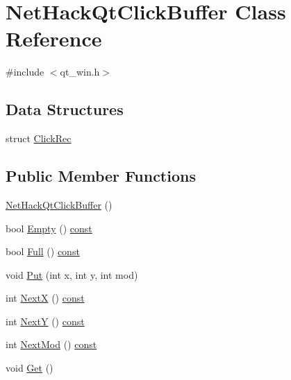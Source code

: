 \hypertarget{classNetHackQtClickBuffer}{\section{Net\+Hack\+Qt\+Click\+Buffer Class Reference}
\label{classNetHackQtClickBuffer}
}


{\ttfamily \#include $<$qt\+\_\+win.\+h$>$}

\subsection*{Data Structures}
\begin{DoxyCompactItemize}
\item 
struct \hyperlink{structNetHackQtClickBuffer_1_1ClickRec}{Click\+Rec}
\end{DoxyCompactItemize}
\subsection*{Public Member Functions}
\begin{DoxyCompactItemize}
\item 
\hyperlink{classNetHackQtClickBuffer_a7bda526e96c5508a468d05b38ef460bf}{Net\+Hack\+Qt\+Click\+Buffer} ()
\item 
bool \hyperlink{classNetHackQtClickBuffer_a1870b7371855d6a4bc2e6a26753d6153}{Empty} () \hyperlink{tradstdc_8h_a2c212835823e3c54a8ab6d95c652660e}{const} 
\item 
bool \hyperlink{classNetHackQtClickBuffer_aaef180051e0b24364a0f1b36603995d9}{Full} () \hyperlink{tradstdc_8h_a2c212835823e3c54a8ab6d95c652660e}{const} 
\item 
void \hyperlink{classNetHackQtClickBuffer_ae509a25bfe7eee23b7980ce39a172649}{Put} (int x, int y, int mod)
\item 
int \hyperlink{classNetHackQtClickBuffer_aad1ee4d7e24e414bd6c110ee7e591820}{Next\+X} () \hyperlink{tradstdc_8h_a2c212835823e3c54a8ab6d95c652660e}{const} 
\item 
int \hyperlink{classNetHackQtClickBuffer_a773bb7d8fe72d5e939d92d9a7125caa2}{Next\+Y} () \hyperlink{tradstdc_8h_a2c212835823e3c54a8ab6d95c652660e}{const} 
\item 
int \hyperlink{classNetHackQtClickBuffer_a5acebd516d80df208fd92c9a578a9442}{Next\+Mod} () \hyperlink{tradstdc_8h_a2c212835823e3c54a8ab6d95c652660e}{const} 
\item 
void \hyperlink{classNetHackQtClickBuffer_a605eec8764adf67f4bbbd9a545bc5226}{Get} ()
\end{DoxyCompactItemize}
